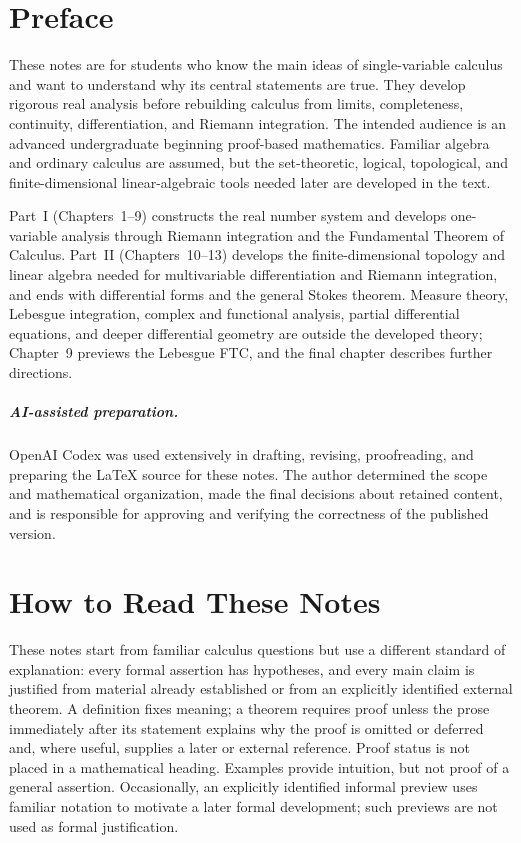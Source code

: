 \chapter*{Preface}
These notes are for students who know the main ideas of single-variable
calculus and want to understand why its central statements are true.  They
develop rigorous real analysis before rebuilding calculus from limits,
completeness, continuity, differentiation, and Riemann integration.  The
intended audience is an advanced undergraduate beginning proof-based
mathematics. Familiar algebra and ordinary calculus are assumed, but the
set-theoretic, logical, topological, and finite-dimensional linear-algebraic
tools needed later are developed in the text.

Part~I (Chapters~1--9) constructs the real number system and develops
one-variable analysis through Riemann integration and the Fundamental
Theorem of Calculus. Part~II (Chapters~10--13) develops the finite-dimensional
topology and linear algebra needed for multivariable differentiation and
Riemann integration, and ends with differential forms and the general Stokes
theorem. Measure theory, Lebesgue integration, complex and functional
analysis, partial differential equations, and deeper differential geometry
are outside the developed theory; Chapter~9 previews the Lebesgue FTC,
and the final chapter describes further directions.

\paragraph{AI-assisted preparation.}
OpenAI Codex was used extensively in drafting, revising, proofreading, and
preparing the \LaTeX{} source for these notes. The author determined the
scope and mathematical organization, made the final decisions about retained
content, and is responsible for approving and verifying the correctness of
the published version.

\chapter*{How to Read These Notes}
These notes start from familiar calculus questions but use a different
standard of explanation: every formal assertion has hypotheses, and every
main claim is justified from material already established or from an
explicitly identified external theorem. A definition fixes meaning; a theorem
requires proof unless the prose immediately after its statement explains why
the proof is omitted or deferred and, where useful, supplies a later or
external reference. Proof status is not placed in a mathematical heading.
Examples provide intuition,
but not proof of a general assertion. Occasionally, an explicitly identified
informal preview uses familiar notation to motivate a later formal
development; such previews are not used as formal justification.

